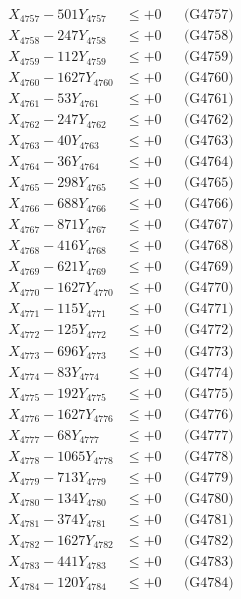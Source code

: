 \documentclass[a4paper,10pt]{article}
\begin{document}
{\begin{align}
X_{4757} - 501Y_{4757} &\leq +0 && \text{(G4757)} \\
X_{4758} - 247Y_{4758} &\leq +0 && \text{(G4758)} \\
X_{4759} - 112Y_{4759} &\leq +0 && \text{(G4759)} \\
X_{4760} - 1627Y_{4760} &\leq +0 && \text{(G4760)} \\
\allowbreak
X_{4761} - 53Y_{4761} &\leq +0 && \text{(G4761)} \\
X_{4762} - 247Y_{4762} &\leq +0 && \text{(G4762)} \\
X_{4763} - 40Y_{4763} &\leq +0 && \text{(G4763)} \\
X_{4764} - 36Y_{4764} &\leq +0 && \text{(G4764)} \\
X_{4765} - 298Y_{4765} &\leq +0 && \text{(G4765)} \\
X_{4766} - 688Y_{4766} &\leq +0 && \text{(G4766)} \\
X_{4767} - 871Y_{4767} &\leq +0 && \text{(G4767)} \\
X_{4768} - 416Y_{4768} &\leq +0 && \text{(G4768)} \\
X_{4769} - 621Y_{4769} &\leq +0 && \text{(G4769)} \\
X_{4770} - 1627Y_{4770} &\leq +0 && \text{(G4770)} \\
\allowbreak
X_{4771} - 115Y_{4771} &\leq +0 && \text{(G4771)} \\
X_{4772} - 125Y_{4772} &\leq +0 && \text{(G4772)} \\
X_{4773} - 696Y_{4773} &\leq +0 && \text{(G4773)} \\
X_{4774} - 83Y_{4774} &\leq +0 && \text{(G4774)} \\
X_{4775} - 192Y_{4775} &\leq +0 && \text{(G4775)} \\
X_{4776} - 1627Y_{4776} &\leq +0 && \text{(G4776)} \\
X_{4777} - 68Y_{4777} &\leq +0 && \text{(G4777)} \\
X_{4778} - 1065Y_{4778} &\leq +0 && \text{(G4778)} \\
X_{4779} - 713Y_{4779} &\leq +0 && \text{(G4779)} \\
X_{4780} - 134Y_{4780} &\leq +0 && \text{(G4780)} \\
\allowbreak
X_{4781} - 374Y_{4781} &\leq +0 && \text{(G4781)} \\
X_{4782} - 1627Y_{4782} &\leq +0 && \text{(G4782)} \\
X_{4783} - 441Y_{4783} &\leq +0 && \text{(G4783)} \\
X_{4784} - 120Y_{4784} &\leq +0 && \text{(G4784)} \\

\end{align}}
\end{document}
